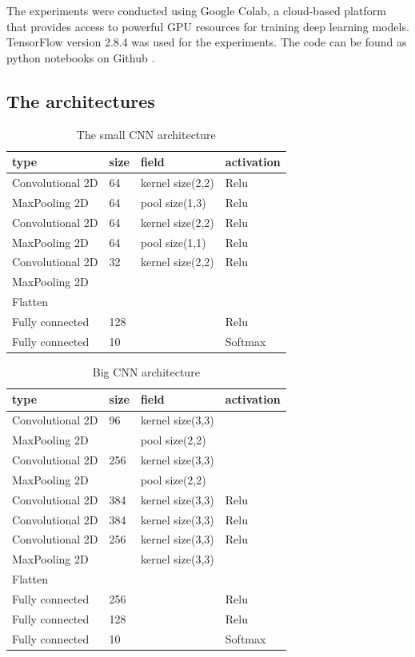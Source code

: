 \documentclass{report}
\theoremstyle{definition}
\theoremstyle{remark}
\begin{document}
The experiments were conducted using Google Colab, a cloud-based platform that provides access to powerful GPU resources for training deep learning models. TensorFlow version 2.8.4 was used for the experiments. The code can be found as python notebooks on Github \cite{GH}.

\subsection{The architectures}
\begin{table}[!hbt]
\centering
\begin{tabularx}{0.7\textwidth}{llll}
\hline
type & size & field & activation \\ \hline
Convolutional 2D & 64 & kernel size(2,2) & Relu \\
MaxPooling 2D & 64 & pool size(1,3) & Relu \\
Convolutional 2D & 64 & kernel size(2,2) & Relu \\
MaxPooling 2D & 64 & pool size(1,1) & Relu \\
Convolutional 2D & 32 & kernel size(2,2) & Relu \\
MaxPooling 2D & & &  \\
Flatten & & &  \\
Fully connected & 128 & & Relu  \\
Fully connected & 10 & & Softmax \\ \hline
\end{tabularx}
\caption{The small CNN architecture}
\label{tab:small_cnn}
\end{table}

\begin{table}[!hbt]
\centering
\begin{tabularx}{0.7\textwidth}{llll}
\hline
type & size & field & activation \\ \hline
Convolutional 2D & 96 & kernel size(3,3) &  \\
MaxPooling 2D &  & pool size(2,2) &  \\
Convolutional 2D & 256 & kernel size(3,3) &  \\
MaxPooling 2D &  & pool size(2,2) &  \\
Convolutional 2D & 384 & kernel size(3,3) & Relu \\
Convolutional 2D & 384 & kernel size(3,3) & Relu \\
Convolutional 2D & 256 & kernel size(3,3) & Relu \\
MaxPooling 2D & & kernel size(3,3) &  \\
Flatten & & &  \\
Fully connected & 256 & & Relu  \\
Fully connected & 128 & & Relu \\ 
Fully connected & 10 & & Softmax \\ 
\hline
\end{tabularx}
\caption{Big CNN architecture}
\label{tab:big_cnn}
\end{table}
\end{document}

